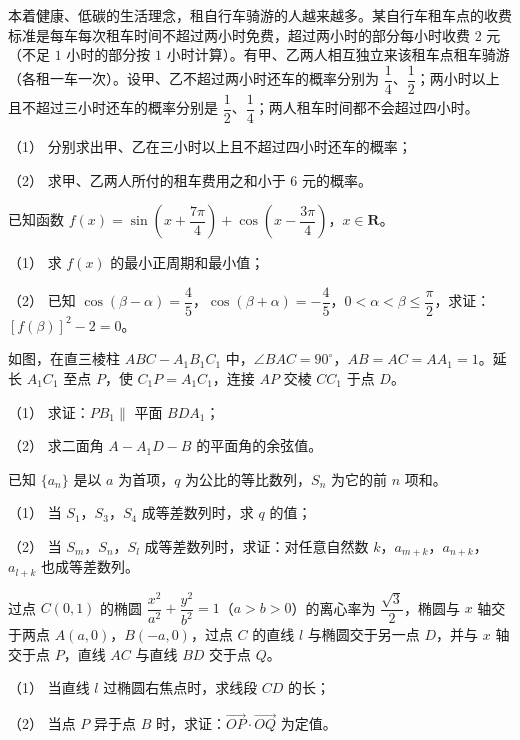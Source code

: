 \begin{question}
本着健康、低碳的生活理念，租自行车骑游的人越来越多。某自行车租车点的收费标准是每车每次租车时间不超过两小时免费，超过两小时的部分每小时收费 $2$ 元（不足 $1$ 小时的部分按 $1$ 小时计算）。有甲、乙两人相互独立来该租车点租车骑游（各租一车一次）。设甲、乙不超过两小时还车的概率分别为 $\dfrac14$、$\dfrac12$；两小时以上且不超过三小时还车的概率分别是 $\dfrac12$、$\dfrac14$；两人租车时间都不会超过四小时。

（1） 分别求出甲、乙在三小时以上且不超过四小时还车的概率；

（2） 求甲、乙两人所付的租车费用之和小于 $6$ 元的概率。

\end{question}
\begin{question}
已知函数 $f(x)=\sin\left(x+\dfrac{7\pi}{4}\right)+\cos\left(x-\dfrac{3\pi}{4}\right)$，$x\in\mathbf R$。

（1） 求 $f(x)$ 的最小正周期和最小值；

（2） 已知 $\cos(\beta-\alpha)=\dfrac45$，$\cos(\beta+\alpha)=-\dfrac45$，$0<\alpha<\beta\leqslant\dfrac{\pi}{2}$，求证：$[f(\beta)]^2-2=0$。

\Needspace{0.4\textheight}
\end{question}
\begin{question}
如图，在直三棱柱 $ABC-A_1B_1C_1$ 中，$\angle BAC=90^\circ$，$AB=AC=AA_1=1$。延长 $A_1C_1$ 至点 $P$，使 $C_1P=A_1C_1$，连接 $AP$ 交棱 $CC_1$ 于点 $D$。

（1） 求证：$PB_1\parallel$ 平面 $BDA_1$；

（2） 求二面角 $A-A_1D-B$ 的平面角的余弦值。
\nopagebreak[4]
\begin{center}\end{center}
\nopagebreak[4]
\end{question}
\begin{question}
已知 $\{a_n\}$ 是以 $a$ 为首项，$q$ 为公比的等比数列，$S_n$ 为它的前 $n$ 项和。

（1） 当 $S_1$，$S_3$，$S_4$ 成等差数列时，求 $q$ 的值；

（2） 当 $S_m$，$S_n$，$S_l$ 成等差数列时，求证：对任意自然数 $k$，$a_{m+k}$，$a_{n+k}$，$a_{l+k}$ 也成等差数列。

\Needspace{0.4\textheight}
\end{question}
\begin{question}
过点 $C(0,1)$ 的椭圆 $\dfrac{x^2}{a^2}+\dfrac{y^2}{b^2}=1$（$a>b>0$）的离心率为 $\dfrac{\sqrt3}{2}$，椭圆与 $x$ 轴交于两点 $A(a,0)$，$B(-a,0)$，过点 $C$ 的直线 $l$ 与椭圆交于另一点 $D$，并与 $x$ 轴交于点 $P$，直线 $AC$ 与直线 $BD$ 交于点 $Q$。

（1） 当直线 $l$ 过椭圆右焦点时，求线段 $CD$ 的长；

（2） 当点 $P$ 异于点 $B$ 时，求证：$\overrightarrow{OP}\cdot\overrightarrow{OQ}$ 为定值。
\nopagebreak[4]
\begin{center}\end{center}
\nopagebreak[4]
\end{question}
